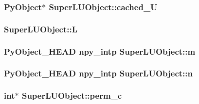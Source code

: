 \subsubsection[{cached\+\_\+\+U}]{\setlength{\rightskip}{0pt plus 5cm}Py\+Object$\ast$ Super\+L\+U\+Object\+::cached\+\_\+\+U}\label{structSuperLUObject_aff679a8d53ae5317eb38b8d7ea0eedd9}
\hypertarget{structSuperLUObject_a6abfd81c3a98d9ece54b68a29d23e7a6}{}
\subsubsection[{L}]{ Super\+L\+U\+Object\+::\+L}\label{structSuperLUObject_a6abfd81c3a98d9ece54b68a29d23e7a6}
\hypertarget{structSuperLUObject_acb3bde18ca1ad2d52a25b6cebb13815c}{}
\subsubsection[{m}]{\setlength{\rightskip}{0pt plus 5cm}Py\+Object\+\_\+\+H\+E\+A\+D npy\+\_\+intp Super\+L\+U\+Object\+::m}\label{structSuperLUObject_acb3bde18ca1ad2d52a25b6cebb13815c}
\hypertarget{structSuperLUObject_a6e09338960b1bf08f182e57f911b177d}{}
\subsubsection[{n}]{\setlength{\rightskip}{0pt plus 5cm}Py\+Object\+\_\+\+H\+E\+A\+D npy\+\_\+intp Super\+L\+U\+Object\+::n}\label{structSuperLUObject_a6e09338960b1bf08f182e57f911b177d}
\hypertarget{structSuperLUObject_a1344cc29fdc5a17e7e0d6dc8f2d6539a}{}
\subsubsection[{perm\+\_\+c}]{\setlength{\rightskip}{0pt plus 5cm}int$\ast$ Super\+L\+U\+Object\+::perm\+\_\+c}\label{structSuperLUObject_a1344cc29fdc5a17e7e0d6dc8f2d6539a}
\hypertarget{structSuperLUObject_ab0fd3683677756df1a061ab36e4e789f}{}
